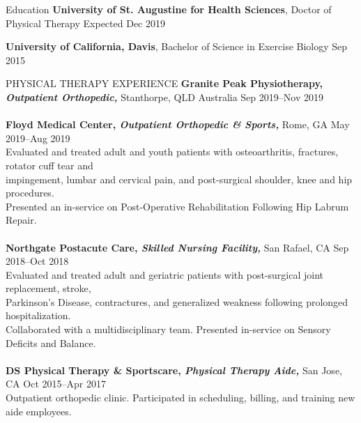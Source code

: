 \documentclass{resume} %
\begin{document}
\vspace{-15pt}
\begin{rSection}{Education}
{\bf University of St. Augustine for Health Sciences}, Doctor of Physical Therapy  \hfill {Expected Dec 2019}

{\bf University of California, Davis}, Bachelor of Science in Exercise Biology  \hfill {Sep 2015}
\end{rSection}
\begin{rSection}{PHYSICAL THERAPY EXPERIENCE}
{\textbf{Granite Peak Physiotherapy, \textit{Outpatient Orthopedic,}} Stanthorpe, QLD Australia
\hfill Sep 2019--Nov 2019 %
}
\\\\
{\textbf{Floyd Medical Center, \textit{Outpatient Orthopedic \& Sports,}} Rome, GA
\hfill May 2019--Aug 2019 \\
 Evaluated and treated adult and youth patients with osteoarthritis, fractures, rotator cuff tear and \\impingement, lumbar and cervical pain, and post-surgical shoulder, knee and hip procedures. \\Presented an in-service on Post-Operative Rehabilitation Following Hip Labrum Repair.}
 \\\\
{\textbf{Northgate Postacute Care, \textit{Skilled Nursing Facility,}} San Rafael, CA
\hfill Sep 2018--Oct 2018 \\
 Evaluated and treated adult and geriatric patients with post-surgical joint replacement, stroke, \\Parkinson's Disease, contractures, and generalized weakness following prolonged hospitalization. \\Collaborated with a multidisciplinary team. Presented in-service on Sensory Deficits and Balance.}
 \\\\
 {\textbf{DS Physical Therapy \& Sportscare, \textit{Physical Therapy Aide,}} San Jose, CA
\hfill Oct 2015--Apr 2017 \\
 Outpatient orthopedic clinic. Participated in scheduling, billing, and training new aide employees.}
\end{rSection} 
\end{document}
